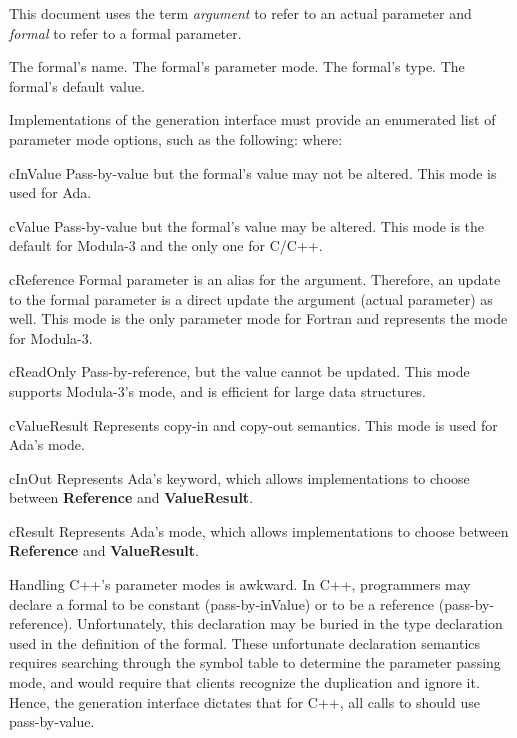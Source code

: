 \begin{functionality}
This document uses the term \emph{argument} to refer to an actual
parameter and \emph{formal} to refer to a formal parameter.  

\begin{Parameters}
 The formal's name.
 The formal's parameter mode.
 The formal's type.
 The formal's default value.
\end{Parameters}

Implementations of the generation interface must provide an enumerated
list of parameter mode options, such as the following:
where:
\begin{Description}
\item [cInValue] Pass-by-value but the formal's value may not be
altered.  This mode is used for Ada.
\item [cValue] Pass-by-value but the formal's value may be altered.
This mode is the default for Modula-3 and the only one for C/C++.
\item [cReference] Formal parameter is an alias for the argument.
Therefore, an update to the formal parameter is a direct update the
argument (actual parameter) as well.  This mode is the only parameter
mode for Fortran and represents the  mode for Modula-3.
\item [cReadOnly] Pass-by-reference, but the value cannot be updated.
This mode supports Modula-3's  mode, and is efficient
for large data structures.
\item [cValueResult] Represents copy-in and copy-out semantics.  This
mode is used for Ada's  mode. 
\item [cInOut] Represents Ada's  keyword, which allows
implementations to choose between \textbf{Reference} and
\textbf{ValueResult}.  
\item [cResult] Represents Ada's  mode, which allows
implementations to choose between \textbf{Reference} and
\textbf{ValueResult}. 
\end{Description}

Handling C++'s parameter modes is awkward.  In C++, programmers may
declare a formal to be constant (\ie pass-by-inValue) or to be a
reference (\ie pass-by-reference).  Unfortunately, this declaration
may be buried in the type declaration used in the definition of the
formal.  These unfortunate declaration semantics requires searching
through the symbol table to determine the parameter passing mode, and
would require that clients recognize the duplication and ignore it.
Hence, the generation interface dictates that for C++, all calls to
 should use pass-by-value.
\end{functionality}

